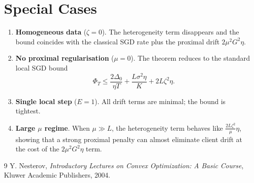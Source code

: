 \documentclass{article}
\begin{document}
\section*{Special Cases}
\begin{enumerate}
\item \textbf{Homogeneous data} ($\zeta=0$).  
The heterogeneity term disappears and the bound coincides with the classical SGD rate plus the proximal drift $2\mu^2G^2\eta$.
\item \textbf{No proximal regularisation} ($\mu=0$).  
The theorem reduces to the standard local SGD bound
\[
\Phi_T\le\frac{2\Delta_0}{\eta T}
+\frac{L\sigma^2\eta}{K}
+2L\zeta^2\eta .
\]
\item \textbf{Single local step} ($E=1$).  
All drift terms are minimal; the bound is tightest.
\item \textbf{Large $\mu$ regime}.  
When $\mu\gg L$, the heterogeneity term behaves like $\frac{2L\zeta^2}{\mu}\eta$, showing that a strong proximal penalty can almost eliminate client drift at the cost of the $2\mu^2G^2\eta$ term.
\end{enumerate}

\begin{thebibliography}{9}
Y. Nesterov,
\textit{Introductory Lectures on Convex Optimization: A Basic Course},
Kluwer Academic Publishers, 2004.
\end{thebibliography}
\end{document}
